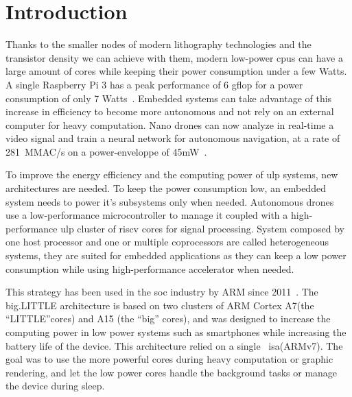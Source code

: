 
\chapter{Introduction}

    Thanks to the smaller nodes of modern lithography technologies and the transistor density we can achieve with them, modern low-power \glspl{cpu} can have a large amount of cores while keeping their power consumption under a few Watts. A single Raspberry Pi 3 has a peak performance of 6 \si{gflop} for a power consumption of only 7 Watts~\cite{Art:RpiClusters}.
    Embedded systems can take advantage of this increase in efficiency to become more autonomous and not rely on an external computer for heavy computation. Nano drones can now analyze in real-time a video signal and train a neural network for autonomous navigation, at a rate of \si{281 MMAC/s} on a power-enveloppe of \si{45mW}~\cite{Art:NanoDrone}.

    To improve the energy efficiency and the computing power of \gls{ulp} systems, new architectures are needed. To keep the power consumption low, an embedded system needs to power it's subsystems only when needed. Autonomous drones~\cite{Art:NanoDrones} use a low-performance microcontroller to manage it coupled with a high-performance \gls{ulp} cluster of \gls{riscv} cores for signal processing. System composed by one host processor and one or multiple coprocessors are called heterogeneous systems, they are suited for embedded applications as they can keep a low power consumption while using high-performance accelerator when needed.

This strategy has been used in the \gls{soc} industry by ARM since 2011~\cite{Art:bigLITTLE}. The  big.LITTLE architecture is based on two clusters of ARM Cortex A7(the ``LITTLE''cores) and A15 (the ``big'' cores), and was designed to increase the computing power in low power systems such as smartphones while increasing the battery life of the device. This architecture relied on a single~ \gls{isa}(ARMv7). The goal was to use the more powerful cores during heavy computation or graphic rendering, and let the low power cores handle the background tasks or manage the device during sleep.


